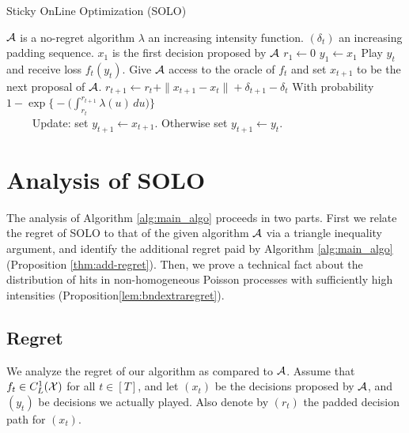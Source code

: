 \begin{algorithm}[h!] 
    \caption{Sticky OnLine Optimization (SOLO)}
\label{alg:main_algo}
\begin{algorithmic}
  \STATE $\mathcal{A}$ is a no-regret algorithm
  \STATE $\lambda$ an increasing intensity function. 
  \STATE $(\delta_t)$ an increasing padding sequence. 
  \STATE $x_1$ is the first decision proposed by $\mathcal{A}$
  \STATE $r_1 \leftarrow 0$
  \STATE $y_1 \leftarrow x_1$ 
  \STATE Play $y_t$ and receive loss $f_t(y_t)$. 
  \STATE Give $\mathcal{A}$ access to the oracle of $f_t$ and set $x_{t+1}$ to be the next proposal of $\mathcal{A}$. 
  \STATE $r_{t+1} \leftarrow r_t + \|x_{t+1} - x_t\| + \delta_{t+1} - \delta_t$
  \STATE With probability $1 - \exp\big\{-\big(\int_{r_t}^{r_{t+1}} \lambda(u)\, du\big)\big\}$ \\
  \STATE $\qquad$ Update: set $y_{t+1} \leftarrow x_{t+1}$. 
  \STATE Otherwise set $y_{t+1} \leftarrow y_t$. 
  \ENDFOR
  
\end{algorithmic}
\end{algorithm}

\section{Analysis of SOLO}
\label{sec:analysis}
The analysis of Algorithm \ref{alg:main_algo} proceeds in two parts. First we relate the regret of SOLO to that of the given algorithm $\mathcal{A}$ via a triangle inequality argument, and identify the additional regret paid by Algorithm \ref{alg:main_algo} (Proposition \ref{thm:add-regret}). Then, we prove a technical fact about the distribution of hits in non-homogeneous Poisson processes with sufficiently high intensities (Proposition\ref{lem:bndextraregret}). 

\subsection{Regret}
We analyze the regret of our algorithm as compared to $\mathcal{A}$.  Assume that $f_t \in C^1_L(\mathcal{X})$ for all $t \in [T]$, and let $(x_t)$  be the decisions proposed by $\mathcal{A}$, and $(y_t)$ be decisions we actually played. Also denote by $(r_t)$ the padded decision path for $(x_t)$. 

